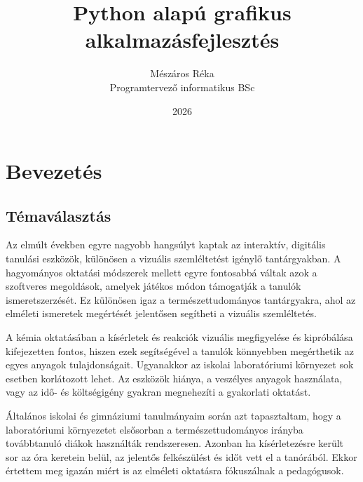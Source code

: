 \documentclass[]{thesis-ekf}
\begin{document}
	
	\title{Python alapú grafikus alkalmazásfejlesztés}
	\author{Mészáros Réka\\Programtervező informatikus BSc}
	\date{2026}
	\maketitle
	
	\tableofcontents
	\listoffigures 
	
	
	
	\chapter{Bevezetés}
	
	\section{Témaválasztás}
	
	Az elmúlt években egyre nagyobb hangsúlyt kaptak az interaktív, digitális tanulási eszközök, különösen a vizuális szemléltetést igénylő tantárgyakban. A hagyományos oktatási módszerek mellett egyre fontosabbá váltak azok a szoftveres megoldások, amelyek játékos módon támogatják a tanulók ismeretszerzését. Ez különösen igaz a természettudományos tantárgyakra, ahol az elméleti ismeretek megértését jelentősen segítheti a vizuális szemléltetés.
	
	
	A kémia oktatásában a kísérletek és reakciók vizuális megfigyelése és kipróbálása kifejezetten fontos, hiszen ezek segítségével a tanulók könnyebben megérthetik az egyes anyagok tulajdonságait. Ugyanakkor az iskolai laboratóriumi környezet sok esetben korlátozott lehet. Az eszközök hiánya, a veszélyes anyagok használata, vagy az idő- és költségigény gyakran megnehezíti a gyakorlati oktatást.
	
	Általános iskolai és gimnáziumi tanulmányaim során azt tapasztaltam, hogy a laboratóriumi környezetet elsősorban a természettudományos irányba továbbtanuló diákok használták rendszeresen. Azonban ha kísérletezésre került sor az óra keretein belül, az jelentős felkészülést és időt vett el a tanórából. Ekkor értettem  meg igazán miért is az elméleti oktatásra fókuszálnak a pedagógusok. 
	
\end{document}
